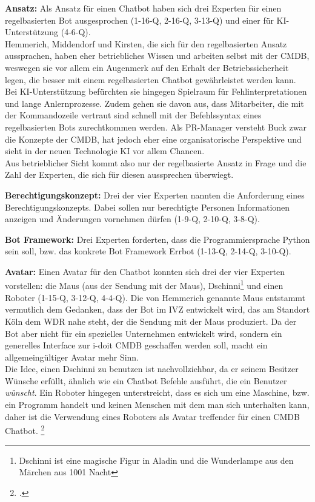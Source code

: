 \textbf{Ansatz:} Als Ansatz für einen Chatbot haben sich drei Experten für einen regelbasierten Bot ausgesprochen (1-16-Q, 2-16-Q, 3-13-Q) und einer für KI-Unterstützung (4-6-Q).\\
Hemmerich, Middendorf und Kirsten, die sich für den regelbasierten Ansatz aussprachen, haben eher betriebliches Wissen und arbeiten selbst mit der \acs{CMDB}, weswegen sie vor allem ein Augenmerk auf den Erhalt der Betriebssicherheit legen, die besser mit einem regelbasierten Chatbot gewährleistet werden kann. Bei KI-Unterstützung befürchten sie hingegen Spielraum für Fehlinterpretationen und lange Anlernprozesse. Zudem gehen sie davon aus, dass Mitarbeiter, die mit der Kommandozeile vertraut sind schnell mit der Befehlssyntax eines regelbasierten Bots zurechtkommen werden. Als PR-Manager versteht Buck zwar die Konzepte der \acs{CMDB}, hat jedoch eher eine organisatorische Perspektive und sieht in der neuen Technologie KI vor allem Chancen.\\
Aus betrieblicher Sicht kommt also nur der regelbasierte Ansatz in Frage und die Zahl der Experten, die sich für diesen aussprechen überwiegt. 

\textbf{Berechtigungskonzept:} Drei der vier Experten nannten die Anforderung eines Berechtigungskonzepts. Dabei sollen nur berechtigte Personen Informationen anzeigen und Änderungen vornehmen dürfen (1-9-Q, 2-10-Q, 3-8-Q).

\textbf{Bot Framework:} Drei Experten forderten, dass die Programmiersprache Python sein soll, bzw. das konkrete Bot Framework Errbot (1-13-Q, 2-14-Q, 3-10-Q).

\textbf{Avatar:} Einen Avatar für den Chatbot konnten sich drei der vier Experten vorstellen: die Maus (aus der Sendung mit der Maus), Dschinni\footnote{Dschinni ist eine magische Figur in Aladin und die Wunderlampe aus den Märchen aus 1001 Nacht} und einen Roboter (1-15-Q, 3-12-Q, 4-4-Q). Die von Hemmerich genannte Maus entstammt vermutlich dem Gedanken, dass der Bot im \acs{IVZ} entwickelt wird, das am Standort Köln dem \acs{WDR} nahe steht, der die Sendung mit der Maus produziert. Da der Bot aber nicht für ein spezielles Unternehmen entwickelt wird, sondern ein generelles Interface zur i-doit \acs{CMDB} geschaffen werden soll, macht ein allgemeingültiger Avatar mehr Sinn.\\
Die Idee, einen Dschinni zu benutzen ist nachvollziehbar, da er seinem Besitzer Wünsche erfüllt, ähnlich wie ein Chatbot Befehle ausführt, die ein Benutzer \textit{wünscht}. Ein Roboter hingegen unterstreicht, dass es sich um eine Maschine, bzw. ein Programm handelt und keinen Menschen mit dem man sich unterhalten kann, daher ist die Verwendung eines Roboters als Avatar treffender für einen \acs{CMDB} Chatbot.
\footcite[Vgl.][o. \pno]{WDR_Maus}


